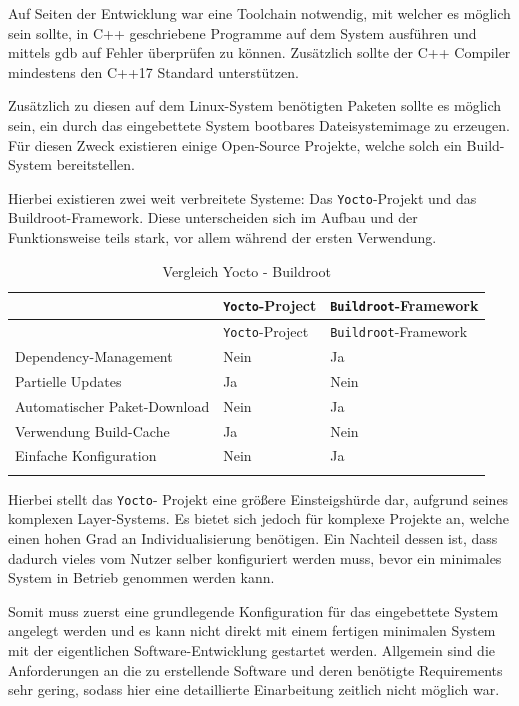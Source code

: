 Auf Seiten der Entwicklung war eine Toolchain notwendig, mit welcher es
möglich sein sollte, in C++ geschriebene Programme auf dem System
ausführen und mittels \gls{gdb} auf Fehler überprüfen zu können.
Zusätzlich sollte der C++ Compiler mindestens den C++17 Standard
unterstützen.

Zusätzlich zu diesen auf dem Linux-System benötigten Paketen sollte es
möglich sein, ein durch das eingebettete System bootbares
Dateisystemimage zu erzeugen. Für diesen Zweck existieren einige
Open-Source Projekte, welche solch ein Build-System bereitstellen.

Hierbei existieren zwei weit verbreitete Systeme: Das
\passthrough{\lstinline!Yocto!}-Projekt\cite{yoctoproject} und das
Buildroot\cite{buildrootproject}-Framework. Diese unterscheiden sich
im Aufbau und der Funktionsweise teils stark, vor allem während der
ersten Verwendung.

\begin{longtable}[]{@{}lll@{}}
\caption{Vergleich Yocto - Buildroot
\label{commchesstables}}\tabularnewline
\toprule
& \passthrough{\lstinline!Yocto!}-Project &
\passthrough{\lstinline!Buildroot!}-Framework\tabularnewline
\midrule
\endfirsthead
\toprule
& \passthrough{\lstinline!Yocto!}-Project &
\passthrough{\lstinline!Buildroot!}-Framework\tabularnewline
\midrule
\endhead
Dependency-Management & Nein & Ja\tabularnewline
Partielle Updates & Ja & Nein\tabularnewline
Automatischer Paket-Download & Nein & Ja\tabularnewline
Verwendung Build-Cache & Ja & Nein\tabularnewline
Einfache Konfiguration & Nein & Ja\tabularnewline
& &\tabularnewline
\bottomrule
\end{longtable}

Hierbei stellt das \passthrough{\lstinline!Yocto!}- Projekt eine größere
Einsteigshürde dar, aufgrund seines komplexen Layer-Systems. Es bietet
sich jedoch für komplexe Projekte an, welche einen hohen Grad an
Individualisierung benötigen. Ein Nachteil dessen ist, dass dadurch
vieles vom Nutzer selber konfiguriert werden muss, bevor ein minimales
System in Betrieb genommen werden kann.

Somit muss zuerst eine grundlegende Konfiguration für das eingebettete
System angelegt werden und es kann nicht direkt mit einem fertigen
minimalen System mit der eigentlichen Software-Entwicklung gestartet
werden. Allgemein sind die Anforderungen an die zu erstellende Software
und deren benötigte Requirements sehr gering, sodass hier eine
detaillierte Einarbeitung zeitlich nicht möglich war.

